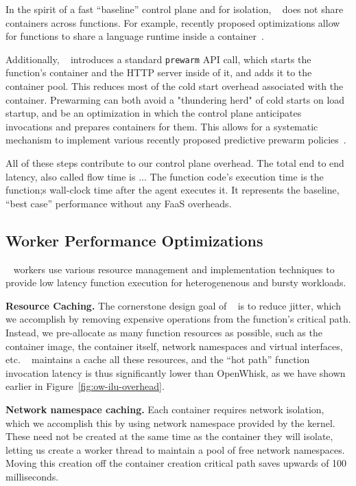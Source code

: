 In the spirit of a fast ``baseline'' control plane and for isolation, \sysname~ does not share containers across functions.
For example, recently proposed optimizations allow for functions to share a language runtime inside a container~\cite{}. 

Additionally, \sysname~ introduces a standard \texttt{prewarm}  API call, which starts the function's container and the HTTP server inside of it, and adds it to the container pool.
This reduces most of the cold start overhead associated with the container.
Prewarming can both avoid a "thundering herd" of cold starts on load startup, and be an optimization in which the control plane anticipates invocations and prepares containers for them. 
This allows for a systematic mechanism to implement various recently proposed predictive prewarm policies~\cite{zhou2022aquatope, icebreaker, shahrad,..}. 


All of these steps contribute to our control plane overhead.
The total end to end latency, also called flow time is ...
The function code's execution time is the function;s wall-clock time after the agent executes it. It represents the baseline, ``best case'' performance without any FaaS overheads. 


\subsection{Worker Performance Optimizations}

\sysname~ workers use various resource management and implementation techniques to provide low latency function execution for heterogenenous and bursty workloads.

\noindent \textbf{Resource Caching.}
The cornerstone design goal of \sysname~ is to reduce jitter, which we accomplish by removing expensive operations from the function's critical path.
Instead, we pre-allocate as many function resources as possible, such as the container image, the container itself, network namespaces and virtual interfaces, etc.
\sysname~ maintains a cache all these resources, and the ``hot path'' function invocation latency is thus significantly lower than OpenWhisk, as we have shown earlier in Figure~\ref{fig:ow-ilu-overhead}.


\textbf{Network namespace caching.}
Each container requires network isolation, which we accomplish this by using network namespace provided by the kernel. 
These need not be created at the same time as the container they will isolate, letting us create a worker thread to maintain a pool of free network namespaces.
Moving this creation off the container creation critical path saves upwards of 100 milliseconds.

